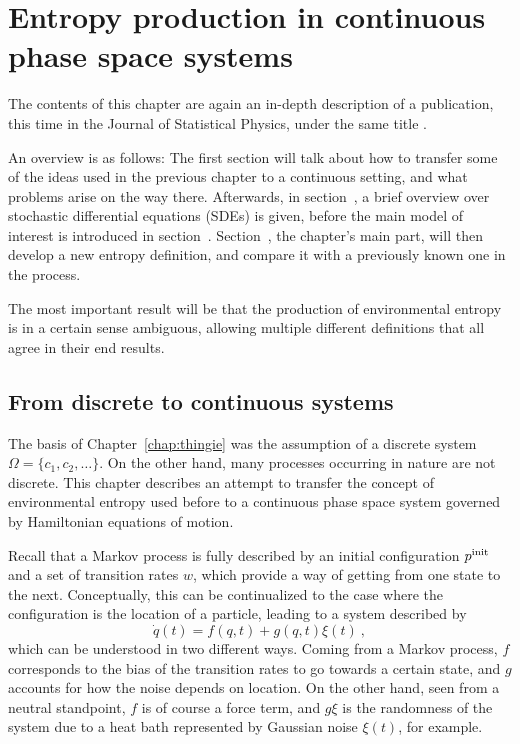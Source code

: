 \chapter{Entropy production in continuous phase space systems}
\label{chap:flow}

The contents of this chapter are again an in-depth description of a publication, this time in the Journal of Statistical Physics, under the same title \cite{flow-paper}.

An overview is as follows: The first section will talk about how to transfer some of the ideas used in the previous chapter to a continuous setting, and what problems arise on the way there. Afterwards, in section~, a brief overview over stochastic differential equations (SDEs) is given, before the main model of interest is introduced in section~. Section~, the chapter's main part, will then develop a new entropy definition, and compare it with a previously known one in the process.

The most important result will be that the production of environmental entropy is in a certain sense ambiguous, allowing multiple different definitions that all agree in their end results.


\section{From discrete to continuous systems}
\label{sec:discrete to continuous}

The basis of Chapter~\ref{chap:thingie} was the assumption of a discrete system \(\Omega = \{c_1, c_2, \ldots\}\). On the other hand, many processes occurring in nature are not discrete. This chapter describes an attempt to transfer the concept of environmental entropy used before to a continuous phase space system \cite{sf, sf-odd-even, sf-overview, koreans} governed by Hamiltonian equations of motion.

Recall that a Markov process is fully described by an initial configuration \(p^{\text{init}}\) and a set of transition rates \(w\), which provide a way of getting from one state to the next. Conceptually, this can be continualized to the case where the configuration is the location of a particle, leading to a system described by
%
\begin{equation}
	\label{eqn:overdamped}
	\dot q(t) = f(q,t) + g(q,t)\xi(t) ~,
\end{equation}
%
which can be understood in two different ways. Coming from a Markov process, \(f\) corresponds to the bias of the transition rates to go towards a certain state, and \(g\) accounts for how the noise depends on location. On the other hand, seen from a neutral standpoint, \(f\) is of course a force term, and \(g\xi\) is the randomness of the system due to a heat bath represented by Gaussian noise \(\xi(t)\), for example.

